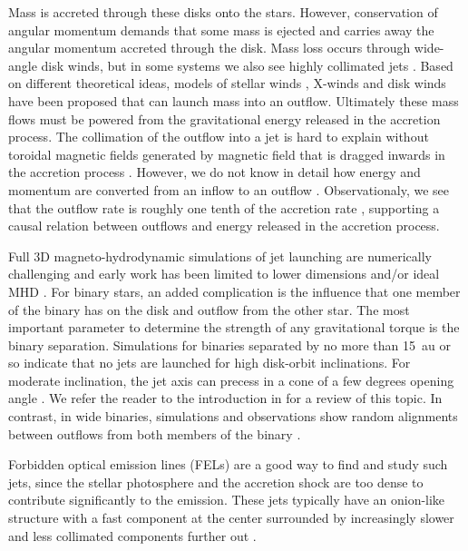 \documentclass[twocolumn,trackchanges]{aastex63}
\begin{document}
Mass is accreted through these disks onto the stars. However,
conservation of angular momentum demands that some mass is ejected and
carries away the angular momentum accreted through
the disk. Mass
loss occurs through wide-angle disk winds, but in some systems we 
also see highly collimated jets \citep[see][for a
    review]{2014prpl.conf..451F}.
Based on different theoretical ideas, models of stellar winds
\citep{1988ApJ...332L..41K,2005ApJ...632L.135M}, X-winds
\citep{1994ApJ...429..781S} and disk winds
\citep{1982MNRAS.199..883B,2005ApJ...630..945A} have been proposed that can
launch mass into an outflow. Ultimately these mass flows  must be powered from
the gravitational energy released in the accretion process. The collimation of the outflow into a jet is hard to
explain without toroidal magnetic fields generated by
magnetic field that is dragged inwards in the accretion process \citep[see
  review by][]{2014ComAC...1....3L}.
 However, we do
not know in detail how energy and momentum are converted from an inflow to an outflow \citep[e.g.][and references therein]{2010ApJ...714..989M}.
Observationaly, we see that the outflow rate is roughly one tenth of the
accretion rate \citep{1990ApJ...354..687C,2008ApJ...689.1112C}, supporting a
causal relation between outflows and energy released in the accretion process. 

Full 3D magneto-hydrodynamic simulations of jet launching are numerically
challenging and early work has been limited to lower dimensions and/or ideal MHD
\citep[e.g.][]{2002ApJ...581..988C,2015MNRAS.450..481D}. For binary stars, an
added complication is the influence that one member of the binary has on the
disk and outflow from the other star. The most important parameter to determine
the strength of any gravitational torque is the binary separation. 
Simulations
for binaries separated by no more than 15~au or so indicate that no jets are
launched for high disk-orbit inclinations. For moderate inclination, the jet
axis can precess in a cone of a few degrees opening angle
\citep{2018ApJ...861...11S}. We refer the reader to the introduction in
\citet{2018ApJ...861...11S} for a review of this topic. In contrast, in wide
binaries, simulations and observations show random alignments between outflows
from both members of the binary \citep{2016ApJ...827L..11O}.

Forbidden optical emission lines (FELs) are a
good way to find and study such jets, since the stellar photosphere and
the accretion shock are too dense to contribute significantly to the emission. 
These jets typically have an onion-like
structure with a fast component at the center surrounded by increasingly
slower and less collimated components further
out \citep{2000ApJ...537L..49B}.
\end{document}
